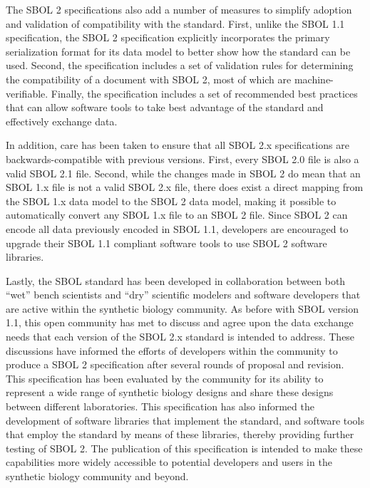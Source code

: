 The SBOL 2 specifications also add a number of measures to simplify adoption and validation of compatibility with the standard.
First, unlike the SBOL 1.1 specification, the SBOL 2 specification explicitly incorporates the primary serialization format for its data model to better show how the standard can be used. Second, the specification includes a set of validation rules for determining the compatibility of a document with SBOL 2, most of which are machine-verifiable. Finally, the specification includes a set of recommended best practices that can allow software tools to take best advantage of the standard and effectively exchange data.

In addition, care has been taken to ensure that all SBOL 2.x specifications are backwards-compatible with previous versions.
First, every SBOL 2.0 file is also a valid SBOL 2.1 file.
Second, while the changes made in SBOL 2 do mean that an SBOL 1.x file is not a valid SBOL 2.x file, there does exist a direct mapping from the SBOL 1.x data model to the SBOL 2 data model, making it possible to automatically convert any SBOL 1.x file to an SBOL 2 file.
Since SBOL 2 can encode all data previously encoded in SBOL 1.1, developers are encouraged to upgrade their SBOL 1.1 compliant software tools to use SBOL 2 software libraries. 

Lastly, the SBOL standard has been developed in collaboration between both ``wet'' bench scientists and ``dry'' scientific modelers and software developers that are active within the synthetic biology community. 
As before with SBOL version 1.1, this open community has met to discuss and agree upon the data exchange needs that each version of the SBOL 2.x standard is intended to address. 
These discussions have informed the efforts of  developers within the community to produce a SBOL 2 specification after several rounds of proposal and revision. This specification has been evaluated by the community for its ability to represent a wide range of synthetic biology designs and share these designs between different laboratories. 
This specification has also informed the development of software libraries that implement the standard, and software tools that employ the standard by means of these libraries, thereby providing further testing of SBOL 2. 
The publication of this specification is intended to make these capabilities more widely accessible to potential developers and users in the synthetic biology community and beyond.